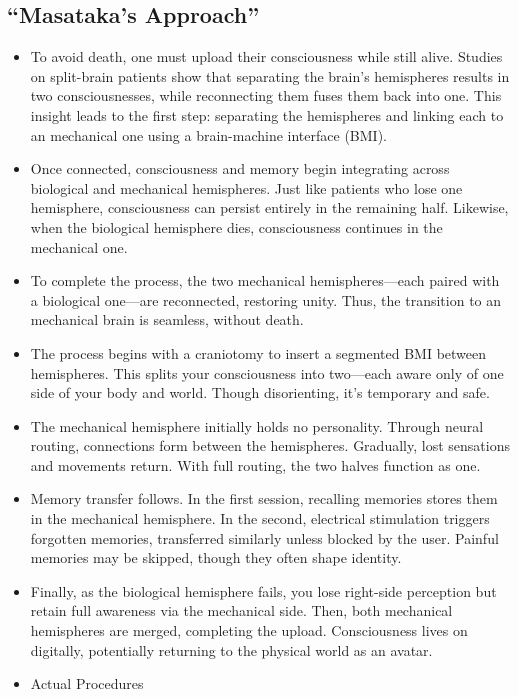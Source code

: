\documentclass[10pt]{article}
\begin{document}
\begin{sloppypar}
  \subsection{“Masataka’s Approach”}
  \label{sec:masataka-approach}

  \begin{itemize}
    \item To avoid death, one must upload their consciousness while still alive. Studies on split-brain patients show that separating the brain’s hemispheres results in two consciousnesses, while reconnecting them fuses them back into one. This insight leads to the first step: separating the hemispheres and linking each to an mechanical one using a brain-machine interface (BMI).
    \item Once connected, consciousness and memory begin integrating across biological and mechanical hemispheres. Just like patients who lose one hemisphere, consciousness can persist entirely in the remaining half. Likewise, when the biological hemisphere dies, consciousness continues in the mechanical one.
    \item To complete the process, the two mechanical hemispheres—each paired with a biological one—are reconnected, restoring unity. Thus, the transition to an mechanical brain is seamless, without death.
    \item The process begins with a craniotomy to insert a segmented BMI between hemispheres. This splits your consciousness into two—each aware only of one side of your body and world. Though disorienting, it’s temporary and safe.
    \item The mechanical hemisphere initially holds no personality. Through neural routing, connections form between the hemispheres. Gradually, lost sensations and movements return. With full routing, the two halves function as one.
    \item Memory transfer follows. In the first session, recalling memories stores them in the mechanical hemisphere. In the second, electrical stimulation triggers forgotten memories, transferred similarly unless blocked by the user. Painful memories may be skipped, though they often shape identity.
    \item Finally, as the biological hemisphere fails, you lose right-side perception but retain full awareness via the mechanical side. Then, both mechanical hemispheres are merged, completing the upload. Consciousness lives on digitally, potentially returning to the physical world as an avatar.
    \item Actual Procedures

\end{itemize}
\end{sloppypar}
\end{document}
